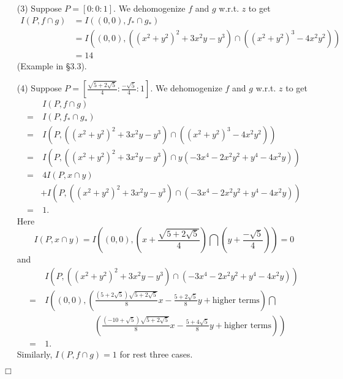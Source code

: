 \documentclass{article}
\begin{document}
\begin{enumerate}
\item[(3)]
  Suppose $P = [0:0:1]$.
  We dehomogenize $f$ and $g$ w.r.t. $z$ to get
  \begin{align*}
    I(P, f \cap g)
    &= I((0,0), f_{*} \cap g_{*}) \\
    &= I((0,0), ((x^2+y^2)^2 + 3x^2y - y^3) \cap ((x^2+y^2)^3 - 4x^2y^2)) \\
    &= 14
  \end{align*}
  (Example in \S 3.3).

\item[(4)]
  Suppose $P = \left[ \frac{\sqrt{5+2\sqrt{5}}}{4} : \frac{-\sqrt{5}}{4} : 1 \right]$.
  We dehomogenize $f$ and $g$ w.r.t. $z$ to get
  \begin{align*}
    & \: I(P, f \cap g) \\
    =& \: I(P, f_{*} \cap g_{*}) \\
    =& \: I(P, ((x^2+y^2)^2 + 3x^2y - y^3) \cap ((x^2+y^2)^3 - 4x^2y^2)) \\
    =& \: I(P, ((x^2+y^2)^2 + 3x^2y - y^3) \cap y(-3x^4-2x^2y^2+y^4 - 4x^2y)) \\
    =& \: 4 I(P, x \cap y) \\
      &+ I(P, ((x^2+y^2)^2 + 3x^2y - y^3) \cap (-3x^4-2x^2y^2+y^4 - 4x^2y)) \\
    =& \: 1.
  \end{align*}
  Here
  \[
    I(P, x \cap y)
    = I\left( (0,0), 
      \left( x+\frac{\sqrt{5+2\sqrt{5}}}{4} \right)
      \bigcap \left( y + \frac{-\sqrt{5}}{4} \right) \right)
    = 0
  \]
  and
  \begin{align*}
    & \: I(P, ((x^2+y^2)^2 + 3x^2y - y^3) \cap (-3x^4-2x^2y^2+y^4 - 4x^2y)) \\
    =& \: I\left( (0,0), \left(
        \frac{(5+2\sqrt{5})\sqrt{5+2\sqrt{5}}}{8}x-\frac{5+2\sqrt{5}}{8}y + \text{higher terms}
      \right) \bigcap \right.\\
      & \qquad\qquad\qquad
      \left. \left(
        \frac{(-10+\sqrt{5})\sqrt{5+2\sqrt{5}}}{8}x-\frac{5+4\sqrt{5}}{8}y + \text{higher terms}
      \right) \right) \\
    =& \: 1.
  \end{align*}
  Similarly, $I(P, f \cap g) = 1$ for rest three cases.
\end{enumerate}
$\Box$ \\\\



\end{document}
